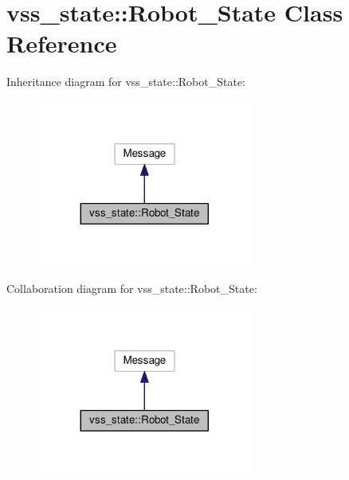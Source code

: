 \hypertarget{classvss__state_1_1Robot__State}{}\section{vss\+\_\+state\+:\+:Robot\+\_\+\+State Class Reference}
\label{classvss__state_1_1Robot__State}


Inheritance diagram for vss\+\_\+state\+:\+:Robot\+\_\+\+State\+:\nopagebreak
\begin{figure}[H]
\begin{center}
\leavevmode
\includegraphics[width=200pt]{classvss__state_1_1Robot__State__inherit__graph}
\end{center}
\end{figure}


Collaboration diagram for vss\+\_\+state\+:\+:Robot\+\_\+\+State\+:\nopagebreak
\begin{figure}[H]
\begin{center}
\leavevmode
\includegraphics[width=200pt]{classvss__state_1_1Robot__State__coll__graph}
\end{center}
\end{figure}
